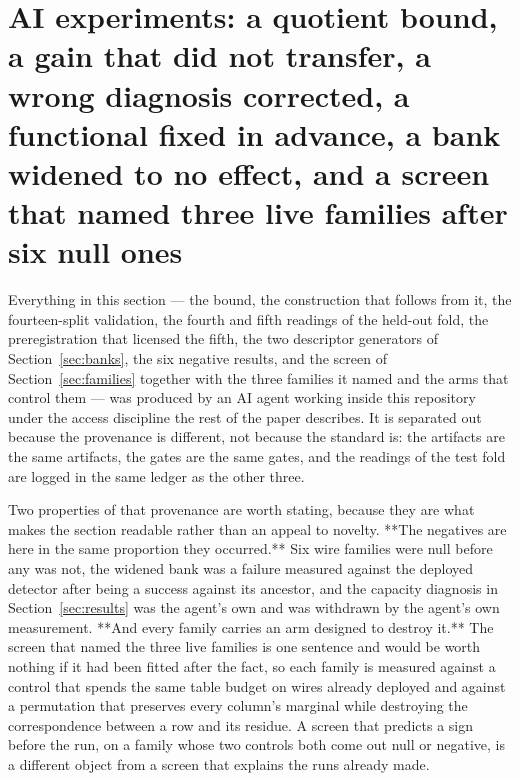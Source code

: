\documentclass[11pt]{article}
\begin{document}
\section{AI experiments: a quotient bound, a gain that did not transfer, a wrong
diagnosis corrected, a functional fixed in advance, a bank widened to no effect,
and a screen that named three live families after six null ones}
\label{sec:ai}
Everything in this section --- the bound, the construction that follows from it,
the fourteen-split validation, the fourth and fifth readings of the held-out
fold, the preregistration that licensed the fifth, the two descriptor
generators of Section~\ref{sec:banks}, the six negative results, and the screen
of Section~\ref{sec:families} together with the three families it named and
the arms that control them --- was produced by an AI agent working inside this
repository under the access discipline the rest of the paper describes. It is
separated out because the provenance is different, not because the standard is:
the artifacts are the same artifacts, the gates are the same gates, and the
readings of the test fold are logged in the same ledger as the other three.

Two properties of that provenance are worth stating, because they are what makes
the section readable rather than an appeal to novelty. **The negatives are here
in the same proportion they occurred.** Six wire families were null before any
was not, the widened bank was a failure measured against the deployed detector
after being a success against its ancestor, and the capacity diagnosis in
Section~\ref{sec:results} was the agent's own and was withdrawn by the agent's
own measurement. **And every family carries an arm designed to destroy it.** The
screen that named the three live families is one sentence and would be worth
nothing if it had been fitted after the fact, so each family is measured against
a control that spends the same table budget on wires already deployed and
against a permutation that preserves every column's marginal while destroying
the correspondence between a row and its residue. A screen that predicts a sign
before the run, on a family whose two controls both come out null or negative, is
a different object from a screen that explains the runs already made.
\end{document}
